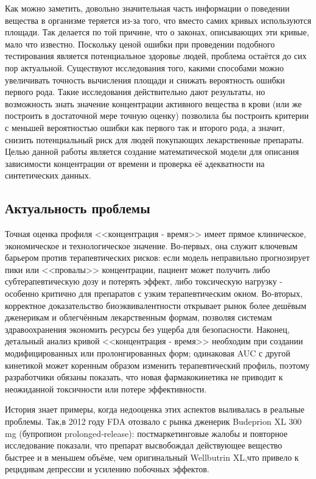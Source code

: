 \documentclass[oneside,senior,etd]{BYUPhys}
\begin{document}
Как можно заметить, довольно значительная часть информации о поведении вещества в организме теряется из-за того, что вместо самих кривых используются площади. Так делается по той причине, что о законах, описывающих эти кривые, мало что известно. Поскольку ценой ошибки при проведении подобного тестирования является потенциальное здоровье людей, проблема остаётся до сих пор актуальной. Существуют исследования того, какими способами можно увеличивать точность вычисления площади и снижать вероятность ошибки первого рода. Такие исследования действительно дают результаты, но возможность знать значение концентрации активного вещества в крови (или же построить в достаточной мере точную оценку) позволила бы построить критерии с меньшей вероятностью ошибки как первого так и второго рода, а значит, снизить потенциальный риск для людей покупающих лекарственные препараты. Целью данной работы является создание математической модели для описания зависимости концентрации от времени и проверка её адекватности на синтетических данных.

\subsection{Актуальность проблемы}

Точная оценка профиля <<концентрация - время>> имеет прямое клиническое, экономическое и технологическое значение. Во‑первых, она служит ключевым барьером против терапевтических рисков: если модель неправильно прогнозирует пики или <<провалы>> концентрации, пациент может получить либо субтерапевтическую дозу и потерять эффект, либо токсическую нагрузку - особенно критично для препаратов с узким терапевтическим окном. Во‑вторых, корректное доказательство биоэквивалентности открывает рынок более дешёвым дженерикам и облегчённым лекарственным формам, позволяя системам здравоохранения экономить ресурсы без ущерба для безопасности. Наконец, детальный анализ кривой <<концентрация - время>> необходим при создании модифицированных или пролонгированных форм; одинаковая AUC с другой кинетикой может коренным образом изменить терапевтический профиль, поэтому разработчики обязаны показать, что новая фармакокинетика не приводит к неожиданной токсичности или потере эффективности.

История знает примеры, когда недооценка этих аспектов выливалась в реальные проблемы. Так,в 2012 году FDA отозвало с рынка дженерик Budeprion XL 300 mg (бупропион prolonged‑release): постмаркетинговые жалобы и повторное исследование показали, что препарат высвобождал действующее вещество быстрее и в меньшем объёме, чем оригинальный Wellbutrin XL,что привело к рецидивам депрессии и усилению побочных эффектов.
\end{document}
